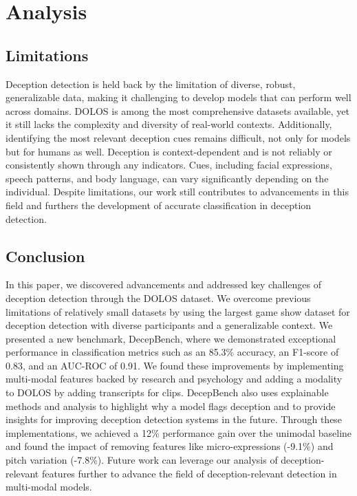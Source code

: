 \documentclass{article} %
\begin{document}
\section{Analysis}
\subsection{Limitations}
Deception detection is held back by the limitation of diverse, robust, generalizable data, making it challenging to develop models that can perform well across domains. DOLOS is among the most comprehensive datasets available, yet it still lacks the complexity and diversity of real-world contexts. Additionally, identifying the most relevant deception cues remains difficult, not only for models but for humans as well. Deception is context-dependent and is not reliably or consistently shown through any indicators. Cues, including facial expressions, speech patterns, and body language, can vary significantly depending on the individual. Despite limitations, our work still contributes to advancements in this field and furthers the development of accurate classification in deception detection.

\subsection{Conclusion}
In this paper, we discovered advancements and addressed key challenges of deception detection through the DOLOS dataset. We overcome previous limitations of relatively small datasets by using the largest game show dataset for deception detection with diverse participants and a generalizable context. We presented a new benchmark, DecepBench, where we demonstrated exceptional performance in classification metrics such as an 85.3\% accuracy, an F1-score of 0.83, and an AUC-ROC of 0.91. We found these improvements by implementing multi-modal features backed by research and psychology and adding a modality to DOLOS \citep{guo2023audiovisualdeceptiondetectiondolos} by adding transcripts for clips. DecepBench also uses explainable methods and analysis to highlight why a model flags deception and to provide insights for improving deception detection systems in the future. Through these implementations, we achieved a 12\% performance gain over the unimodal baseline and found the impact of removing features like micro-expressions (-9.1\%) and pitch variation (-7.8\%). Future work can leverage our analysis of deception-relevant features further to advance the field of deception-relevant detection in multi-modal models.
\end{document}
